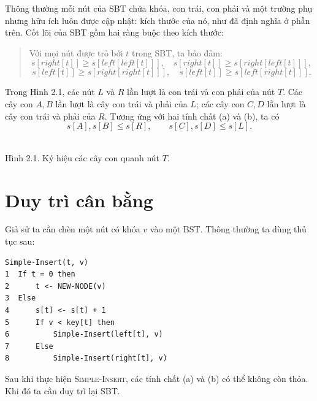 \documentclass[11pt]{article}
\newcommand{\sbtleafat}[2]{%
  \begin{scope}[shift={(#1)}]
    \draw[sbt leaf] (0,0.42)--(-0.45,-0.32)--(0.45,-0.32)--cycle;
    \node[font=\small] at (0,-0.02) {$#2$};
  \end{scope}%
}
\begin{document}
Thông thường mỗi nút của SBT chứa khóa, con trái, con phải và một trường phụ
nhưng hữu ích luôn được cập nhật: kích thước của nó, như đã định nghĩa ở
phần trên. Cốt lõi của SBT gồm hai ràng buộc theo kích thước:

\begin{quote}
Với mọi nút được trỏ bởi $t$ trong SBT, ta bảo đảm:
\[
\tag{a}
s[\mathit{right}[t]] \ge
s[\mathit{left}[\mathit{left}[t]]],\quad
s[\mathit{right}[t]] \ge
s[\mathit{right}[\mathit{left}[t]]],
\]
\[
\tag{b}
s[\mathit{left}[t]] \ge
s[\mathit{right}[\mathit{right}[t]]],\quad
s[\mathit{left}[t]] \ge
s[\mathit{left}[\mathit{right}[t]]].
\]
\end{quote}

Trong Hình 2.1, các nút $L$ và $R$ lần lượt là con trái và con phải của nút
$T$. Các cây con $A,B$ lần lượt là cây con trái và phải của $L$; các cây con
$C,D$ lần lượt là cây con trái và phải của $R$. Tương ứng với hai tính chất
(a) và (b), ta có
\[
  s[A],s[B]\le s[R],
  \qquad
  s[C],s[D]\le s[L].
\]

\begin{center}
\\[-0.2em]
{\small Hình 2.1. Ký hiệu các cây con quanh nút $T$.}
\end{center}

\section{Duy trì cân bằng}

Giả sử ta cần chèn một nút có khóa $v$ vào một BST. Thông thường ta dùng thủ
tục sau:

\begin{verbatim}
Simple-Insert(t, v)
1  If t = 0 then
2      t <- NEW-NODE(v)
3  Else
4      s[t] <- s[t] + 1
5      If v < key[t] then
6          Simple-Insert(left[t], v)
7      Else
8          Simple-Insert(right[t], v)
\end{verbatim}

Sau khi thực hiện \textsc{Simple-Insert}, các tính chất (a) và (b) có thể
không còn thỏa. Khi đó ta cần duy trì lại SBT.
\end{document}
